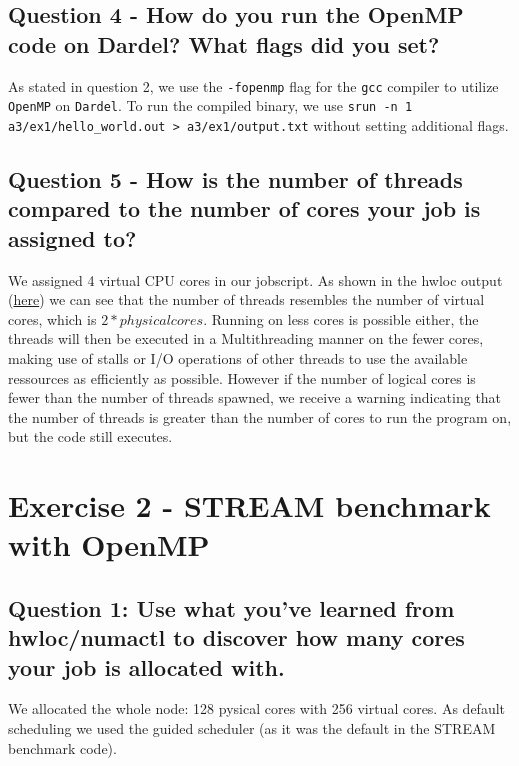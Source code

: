 \documentclass[a4paper,10pt]{article}
\begin{document}
\subsection{Question 4 - How do you run the OpenMP code on Dardel? What flags did you set?}
As stated in question 2, we use the \verb|-fopenmp| flag for the \verb|gcc| compiler to utilize \verb|OpenMP| on \verb|Dardel|.
To run the compiled binary, we use \verb|srun -n 1 a3/ex1/hello_world.out > a3/ex1/output.txt| without setting additional flags.

\subsection{Question 5 - How is the number of threads compared to the number of cores your job is assigned to?}
We assigned 4 virtual CPU cores in our jobscript. As shown in the hwloc output (\href{https://github.com/paulmyr/DD2356-MethodsHPC/blob/master/3_open_mp/img/ex1/topology.svg}{here}) we can see that the number of threads resembles the number of virtual cores, which is $2 * physical cores$. Running on less cores is possible either, 
the threads will then be executed in a Multithreading manner on the fewer cores, making use of stalls or I/O operations of other threads to use the available ressources as efficiently as possible. However if the number of logical cores
is fewer than the number of threads spawned, we receive a warning indicating that the number of threads is greater than the number of cores to run the program on, but the code still executes.

\section{Exercise 2 - STREAM benchmark with OpenMP}
\subsection{Question 1: Use what you've learned from hwloc/numactl to discover how many cores your job is allocated with.}
We allocated the whole node: 128 pysical cores with 256 virtual cores.
As default scheduling we used the guided scheduler (as it was the default in the STREAM benchmark code).
\end{document}
